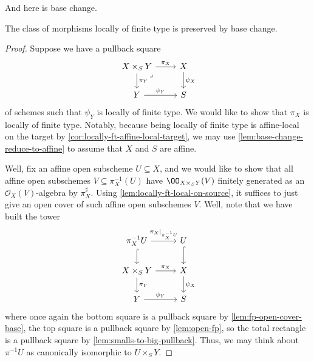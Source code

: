 \documentclass[../notes.tex]{subfiles}
\begin{document}
And here is base change.
\begin{lemma} \label{lem:locally-ft-base-change}
	The class of morphisms locally of finite type is preserved by base change.
\end{lemma}
\begin{proof}
	Suppose we have a pullback square
	\[\begin{tikzcd}
		{X\times_SY} & X \\
		Y & S
		\arrow["{\psi_Y}", from=2-1, to=2-2]
		\arrow["{\pi_X}", from=1-1, to=1-2]
		\arrow["{\pi_Y}", from=1-1, to=2-1]
		\arrow["{\psi_X}", from=1-2, to=2-2]
		\arrow["\lrcorner"{anchor=center, pos=0.125}, draw=none, from=1-1, to=2-2]
	\end{tikzcd}\]
	of schemes such that $\psi_Y$ is locally of finite type. We would like to show that $\pi_X$ is locally of finite type. Notably, because being locally of finite type is affine-local on the target by \autoref{cor:locally-ft-affine-local-target}, we may use \autoref{lem:base-change-reduce-to-affine} to assume that $X$ and $S$ are affine.

	Well, fix an affine open subscheme $U\subseteq X$, and we would like to show that all affine open subschemes $V\subseteq\pi_X^{-1}(U)$ have $\OO_{X\times_SY}(V)$ finitely generated as an $\mathcal O_X(V)$-algebra by $\pi_X^\sharp$. Using \autoref{lem:locally-ft-local-on-source}, it suffices to just give an open cover of such affine open subschemes $V$. Well, note that we have built the tower
	\[\begin{tikzcd}
		{\pi_X^{-1}U} & U \\
		{X\times_SY} & X \\
		Y & S
		\arrow["{\psi_Y}", from=3-1, to=3-2]
		\arrow["{\psi_X}", from=2-2, to=3-2]
		\arrow["{\pi_X}", from=2-1, to=2-2]
		\arrow["{\pi_Y}", from=2-1, to=3-1]
		\arrow[hook, from=1-2, to=2-2]
		\arrow[hook, from=1-1, to=2-1]
		\arrow["{\pi_X|_{\pi_X^{-1}U}}", from=1-1, to=1-2]
	\end{tikzcd}\]
	where once again the bottom square is a pullback square by \autoref{lem:fp-open-cover-base}, the top square is a pullback square by \autoref{lem:open-fp}, so the total rectangle is a pullback square by \autoref{lem:smalls-to-big-pullback}. Thus, we may think about $\pi^{-1}U$ as canonically isomorphic to $U\times_SY$.


\end{proof}
\end{document}
